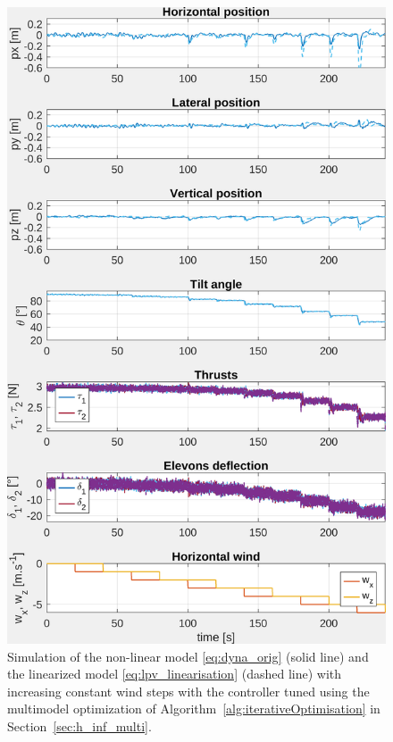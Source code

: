 \begin{figure}[ht!]
    \centering
    \includegraphics[trim=0cm 0cm 0cm 0cm,clip,width=0.9\columnwidth]{figures/sim_systune_lpv_noise.png}
    \caption{Simulation of the non-linear model \eqref{eq:dyna_orig} (solid line) and the linearized model  \eqref{eq:lpv_linearisation} (dashed line) with increasing constant wind steps with the controller tuned using the multimodel optimization of Algorithm~\ref{alg:iterativeOptimisation} in  Section~\ref{sec:h_inf_multi}.}
    \label{fig:SimSytuneStruct_lpv}
\end{figure}

